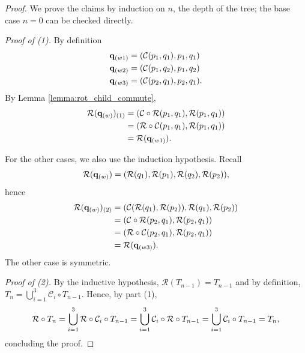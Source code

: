 \documentclass[12pt]{amsart}
\begin{document}
\begin{proof}
	We prove the claims by induction on $n$, the depth of the tree; the base case $n = 0$ can be checked directly. 
	
	{\it Proof of (1).} 
	By definition
	\begin{align*}
	\mathbf{q}_{(w1)} &= ( \mathcal{C}(p_1, q_1), p_1, q_1) \\
	\mathbf{q}_{(w2)} &= ( \mathcal{C}(p_1, q_2), p_1, q_2) \\
	\mathbf{q}_{(w3)} &= ( \mathcal{C}(p_2, q_1), p_2, q_1).
	\end{align*}
	By Lemma \ref{lemma:rot_child_commute}, 
	\begin{align*}
	\mathcal{R}(\mathbf{q}_{(w)})_{(1)} &= ( \mathcal{C} \circ \mathcal{R}(p_1, q_1), \mathcal{R}(p_1, q_1))  \\
	&= (  \mathcal{R} \circ \mathcal{C} (p_1, q_1), \mathcal{R}(p_1, q_1)) \\
	&= \mathcal{R}(\mathbf{q}_{(w1)}).
	\end{align*}
	
	For the other cases, we also use the induction hypothesis. 
	Recall
	\[
	\mathcal{R}(\mathbf{q}_{(w)}) = (\mathcal{R}(q_1), \mathcal{R}(p_1), \mathcal{R}(q_2), \mathcal{R}(p_2)),
	\]
	hence
	\begin{align*}
	\mathcal{R}(\mathbf{q}_{(w)})_{(2)} &=  ( \mathcal{C} (\mathcal{R}(q_1),\mathcal{R}(p_2)), \mathcal{R}(q_1),\mathcal{R}(p_2)) \\
	&= ( \mathcal{C} \circ \mathcal{R}(p_2, q_1), \mathcal{R}(p_2, q_1))  \\
	&= (  \mathcal{R} \circ \mathcal{C} (p_2, q_1), \mathcal{R}(p_2, q_1)) \\
	&= \mathcal{R}(\mathbf{q}_{(w3)}).
	\end{align*}
	The other case is symmetric.	
	
%	
	
	{\it Proof of (2).}
	By the inductive hypothesis, $\mathcal{R}(T_{n-1}) = T_{n-1}$ and by definition, $T_n = \bigcup_{i=1}^3 \mathcal{C}_i \circ T_{n-1} $. 
	Hence, by part (1), 
	\[
	\mathcal{R} \circ T_n = \bigcup_{i=1}^3 \mathcal{R} \circ \mathcal{C}_i \circ T_{n-1} \\
	=  \bigcup_{i=1}^3  \mathcal{C}_i \circ \mathcal{R} \circ T_{n-1} \\
	=  \bigcup_{i=1}^3  \mathcal{C}_i \circ T_{n-1} \\
	= T_n,
	\]
	concluding the proof. 
\end{proof}
\end{document}

